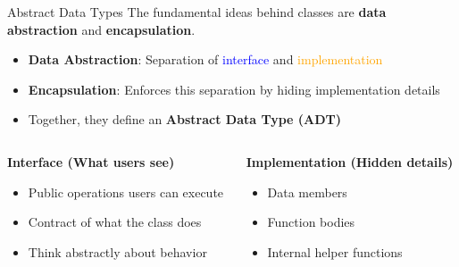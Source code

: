 \begin{frame}[fragile]{Abstract Data Types}
	The fundamental ideas behind classes are \textbf{data abstraction} and \textbf{encapsulation}.

	\begin{itemize}
		\item \textbf{Data Abstraction}: Separation of \textcolor{blue}{interface} and \textcolor{orange}{implementation}
		\item \textbf{Encapsulation}: Enforces this separation by hiding implementation details
		\item Together, they define an \textbf{Abstract Data Type (ADT)}
	\end{itemize}

	\vspace{0.3em}
	\begin{columns}
		\begin{column}{0.5\textwidth}
			\textbf{Interface (What users see)}
			\begin{itemize}
				\item Public operations users can execute
				\item Contract of what the class does
				\item Think abstractly about behavior
			\end{itemize}
		\end{column}
		\begin{column}{0.5\textwidth}
			\textbf{Implementation (Hidden details)}
			\begin{itemize}
				\item Data members
				\item Function bodies
				\item Internal helper functions
			\end{itemize}
		\end{column}
	\end{columns}
\end{frame}

